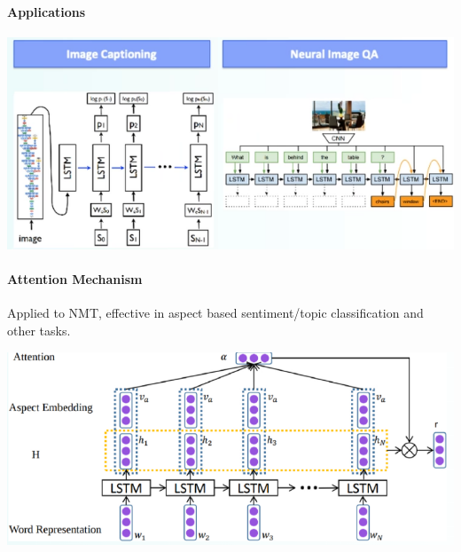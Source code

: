 \documentclass[10pt]{report}
\begin{document}
\paragraph{Applications}
\begin{center}
	\includegraphics[scale=0.75]{132.png}
\end{center}
\pagebreak
\paragraph{Attention Mechanism} Applied to NMT, effective in aspect based sentiment/topic classification and other tasks.
\begin{center}
	\includegraphics[scale=0.5]{140.png}
\end{center}
\end{document}

